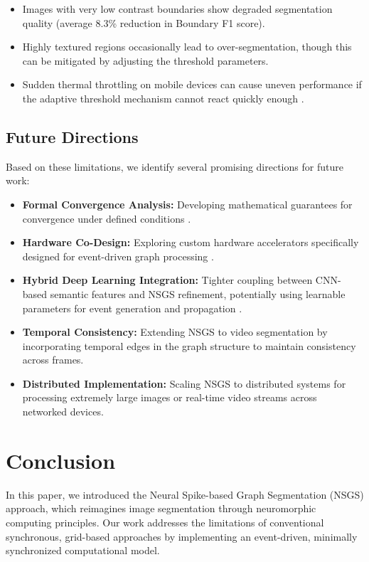 \documentclass[conference]{IEEEtran}
\begin{document}
\begin{itemize}
    \item Images with very low contrast boundaries show degraded segmentation quality (average 8.3\% reduction in Boundary F1 score).
    
    \item Highly textured regions occasionally lead to over-segmentation, though this can be mitigated by adjusting the threshold parameters.
    
    \item Sudden thermal throttling on mobile devices can cause uneven performance if the adaptive threshold mechanism cannot react quickly enough \cite{Bartolozzi2022}.
\end{itemize}

\subsection{Future Directions}
Based on these limitations, we identify several promising directions for future work:

\begin{itemize}
    \item \textbf{Formal Convergence Analysis:} Developing mathematical guarantees for convergence under defined conditions \cite{Hochreiter1997}.
    
    \item \textbf{Hardware Co-Design:} Exploring custom hardware accelerators specifically designed for event-driven graph processing \cite{He2016, Fukushima1980, Akopyan2015}.
    
    \item \textbf{Hybrid Deep Learning Integration:} Tighter coupling between CNN-based semantic features and NSGS refinement, potentially using learnable parameters for event generation and propagation \cite{Lin2022, Wang2020}.
    
    \item \textbf{Temporal Consistency:} Extending NSGS to video segmentation by incorporating temporal edges in the graph structure to maintain consistency across frames.
    
    \item \textbf{Distributed Implementation:} Scaling NSGS to distributed systems for processing extremely large images or real-time video streams across networked devices.
\end{itemize}

\section{Conclusion} \label{sec:conclusion}
In this paper, we introduced the Neural Spike-based Graph Segmentation (NSGS) approach, which reimagines image segmentation through neuromorphic computing principles. Our work addresses the limitations of conventional synchronous, grid-based approaches by implementing an event-driven, minimally synchronized computational model.
\end{document}
